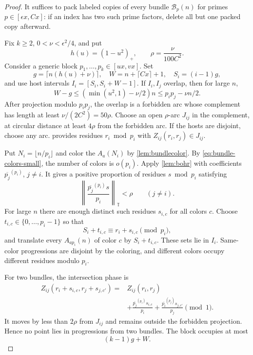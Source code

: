 \documentclass[11pt,a4paper]{article}
\theoremstyle{plain}
\theoremstyle{definition}
\theoremstyle{remark}
\newcommand{\T}{\mathbb T}
\newcommand{\cB}{\mathcal B}
\newcommand{\norm}[1]{\left\lVert #1\right\rVert_{\T}}
\begin{document}
\label{pf:mainrange}
\propmainrange*
\begin{proof}
It suffices to pack labeled copies of every bundle $\cB_p(n)$ for primes $p\in[\epsilon x,Cx]$: if an index has two such prime factors, delete all but one packed copy afterward.

Fix $k\ge2$, $0<\nu<\epsilon^2/4$, and put
\[
 h(u)=(1-u^2)_+,\qquad \rho=\frac{\nu}{100C^2}.
\]
Consider a generic block $p_1,\ldots,p_k\in[ux,vx]$. Set
\[
 g=\lceil n(h(u)+\nu)\rceil,\quad
 W=n+\lceil Cx\rceil+1,\quad S_i=(i-1)g,
\]
and use host intervals $I_i=[S_i,S_i+W-1]$. If $I_i,I_j$ overlap, then for large $n$,
\[
 W-g\le(\min(u^2,1)-\nu/2)n
 \le p_ip_j-\nu n/2.
\tag{A.5}
\]
After projection modulo $p_ip_j$, the overlap is a forbidden arc whose complement has length at least $\nu/(2C^2)=50\rho$. Choose an open $\rho$-arc $J_{ij}$ in the complement, at circular distance at least $4\rho$ from the forbidden arc. If the hosts are disjoint, choose any arc.  provides residues $r_i\bmod p_i$ with $Z_{ij}(r_i,r_j)\in J_{ij}$.

Put $N_i=\lfloor n/p_i\rfloor$ and color the $A_a(N_i)$ by \cref{lem:bundlecolor}. By \eqref{eq:bundle-colors-small}, the number of colors is $o(p_i)$. Apply \cref{lem:bohr} with coefficients $\overline{p_j}^{(p_i)}$, $j\ne i$. It gives a positive proportion of residues $s\bmod p_i$ satisfying
\[
 \norm{\frac{\overline{p_j}^{(p_i)}s}{p_i}}<\rho
 \qquad(j\ne i).
\tag{A.6}
\]
For large $n$ there are enough distinct such residues $s_{i,c}$ for all colors $c$. Choose $t_{i,c}\in\{0,\ldots,p_i-1\}$ so that
\[
 S_i+t_{i,c}\equiv r_i+s_{i,c}\pmod{p_i},
\]
and translate every $A_{ap_i}(n)$ of color $c$ by $S_i+t_{i,c}$. These sets lie in $I_i$. Same-color progressions are disjoint by the coloring, and different colors occupy different residues modulo $p_i$.

For two bundles, the intersection phase is
\[
\begin{aligned}
Z_{ij}(r_i+s_{i,c},r_j+s_{j,c'})
={}&Z_{ij}(r_i,r_j)\\
&+\frac{\overline{p_j}^{(p_i)}s_{i,c}}{p_i}
+\frac{\overline{p_i}^{(p_j)}s_{j,c'}}{p_j}\pmod1.
\end{aligned}
\tag{A.7}
\]
It moves by less than $2\rho$ from $J_{ij}$ and remains outside the forbidden projection. Hence no point lies in progressions from two bundles. The block occupies at most
\[
 (k-1)g+W.
\tag{A.8}\label{eq:block-span}
\]


\end{proof}
\end{document}

